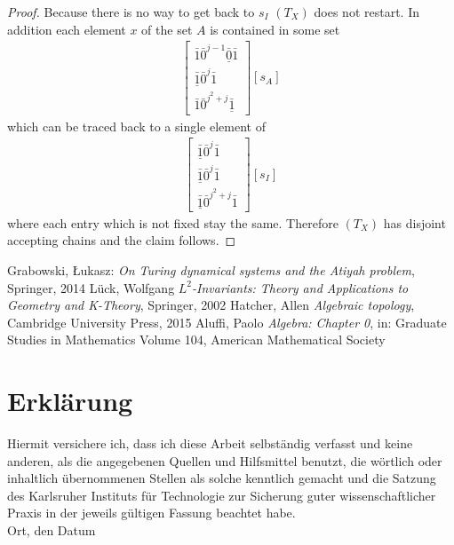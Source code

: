 \documentclass[12pt,a4paper]{scrartcl}
\theoremstyle{plain}
\theoremstyle{definition}
\numberwithin{equation}{section}
\newcommand{\2}{\mathbb{Z} / 2 \mathbb{Z}}
\newcommand{\1}{\bar{1}}
\newcommand{\0}{\bar{0}}
\begin{document}
\begin{proof}
Because there is no way to get back to $s_I$ $(T_X)$ does not restart. In addition each element $x$ of the set $A$ is contained in some set
\begin{align*}
	\begin{bmatrix}
		\1 \0^{j - 1} \underline{\0} \1 \\
		\underline{\1} \0^j \1 \\
		\1 \0^{j^2 + j} \underline{\1}
	\end{bmatrix}[s_A]
\end{align*}
which can be traced back to a single element of 
\begin{align*}
	\begin{bmatrix}
		\underline{\1} \0^j \1 \\
		\underline{\1} \0^j \1 \\
		\underline{\1} \0^{j^2 + j} \1
	\end{bmatrix}[s_I]
\end{align*}
where each entry which is not fixed stay the same. Therefore $(T_X)$ has disjoint accepting chains and the claim follows.
\end{proof}

  \newpage

\begin{thebibliography}{Lam00}
  Grabowski, \L ukasz: \emph{On Turing dynamical systems and the Atiyah problem}, Springer, 2014
  Lück, Wolfgang $L^2$\emph{-Invariants: Theory and Applications to Geometry and K-Theory}, Springer, 2002
  Hatcher, Allen \emph{Algebraic topology}, Cambridge University Press, 2015
  Aluffi, Paolo \emph{Algebra: Chapter 0}, in: Graduate Studies in Mathematics Volume 104, American Mathematical Society
\end{thebibliography}
 
      

\newpage
  
 \thispagestyle{empty}


\vspace*{8cm}


\section*{Erklärung}

Hiermit versichere ich, dass ich diese Arbeit selbständig verfasst und keine anderen, als die angegebenen Quellen und Hilfsmittel benutzt, die wörtlich oder inhaltlich übernommenen Stellen als solche kenntlich gemacht und die Satzung des Karlsruher Instituts für Technologie zur Sicherung guter wissenschaftlicher Praxis in der jeweils gültigen Fassung beachtet habe. \\[2ex] 

\noindent
Ort, den Datum\\[5ex]

\end{document}
